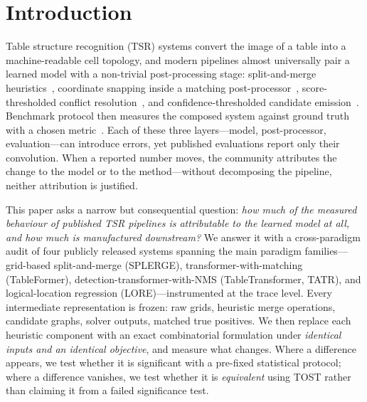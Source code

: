 \documentclass[final,5p,times,twocolumn]{elsarticle}
\begin{document}
\section{Introduction}\label{sec:intro}

Table structure recognition (TSR) systems convert the image of a table into a
machine-readable cell topology, and modern pipelines almost universally pair a
learned model with a non-trivial post-processing stage: split-and-merge
heuristics~\cite{zhong2020,tensmeyer2019}, coordinate snapping inside a
matching post-processor~\cite{nassar2022tableformer,auer2024docling},
score-thresholded conflict resolution~\cite{smock2022pubtables1m}, and
confidence-thresholded candidate emission~\cite{xing2023lore}. Benchmark
protocol then measures the composed system against ground truth with a chosen
metric~\cite{zhong2020,smock2023grits}. Each of these three layers---model,
post-processor, evaluation---can introduce errors, yet published evaluations
report only their convolution. When a reported number moves, the community
attributes the change to the model or to the method---without decomposing the
pipeline, neither attribution is justified.

This paper asks a narrow but consequential question: \emph{how much of the
measured behaviour of published TSR pipelines is attributable to the learned
model at all, and how much is manufactured downstream?} We answer it with a
cross-paradigm audit of four publicly released systems spanning the main
paradigm families---grid-based split-and-merge (SPLERGE),
transformer-with-matching (TableFormer), detection-transformer-with-NMS
(TableTransformer, TATR), and logical-location regression (LORE)---instrumented
at the trace level. Every intermediate representation is
frozen: raw grids, heuristic merge operations, candidate graphs, solver
outputs, matched true positives. We then replace each heuristic component with
an exact combinatorial formulation under \emph{identical inputs and an
identical objective}, and measure what changes. Where a difference appears, we
test whether it is significant with a pre-fixed statistical protocol; where a
difference vanishes, we test whether it is \emph{equivalent} using TOST rather
than claiming it from a failed significance test.
\end{document}
